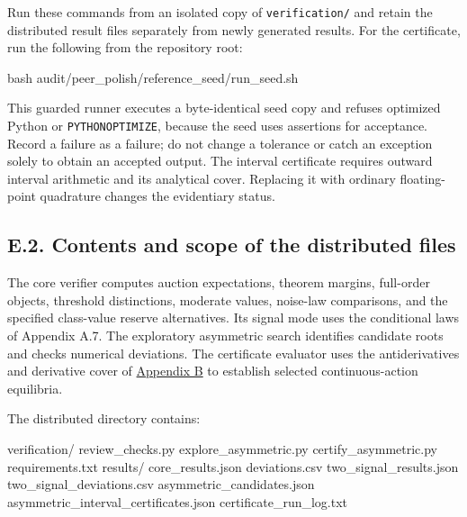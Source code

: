 \documentclass[
  11pt,
]{article}
\newenvironment{Shaded}{}{}
\newcommand{\FunctionTok}[1]{\textcolor[rgb]{0.02,0.16,0.49}{#1}}
\newcommand{\NormalTok}[1]{#1}
\begin{document}
Run these commands from an isolated copy of \texttt{verification/} and
retain the distributed result files separately from newly generated
results. For the certificate, run the following from the repository
root:

\begin{Shaded}
\begin{Highlighting}[]
\FunctionTok{bash}\NormalTok{ audit/peer\_polish/reference\_seed/run\_seed.sh}
\end{Highlighting}
\end{Shaded}

This guarded runner executes a byte-identical seed copy and refuses
optimized Python or \texttt{PYTHONOPTIMIZE}, because the seed uses
assertions for acceptance. Record a failure as a failure; do not change
a tolerance or catch an exception solely to obtain an accepted output.
The interval certificate requires outward interval arithmetic and its
analytical cover. Replacing it with ordinary floating-point quadrature
changes the evidentiary status.

\subsection{E.2. Contents and scope of the distributed
files}\label{oa-e-files}

The core verifier computes auction expectations, theorem margins,
full-order objects, threshold distinctions, moderate values, noise-law
comparisons, and the specified class-value reserve alternatives. Its
signal mode uses the conditional laws of Appendix A.7. The exploratory
asymmetric search identifies candidate roots and checks numerical
deviations. The certificate evaluator uses the antiderivatives and
derivative cover of \hyperref[oa-b]{Appendix B} to establish selected
continuous-action equilibria.

The distributed directory contains:

\begin{Shaded}
\begin{Highlighting}[]
\NormalTok{verification/}
\NormalTok{  review\_checks.py}
\NormalTok{  explore\_asymmetric.py}
\NormalTok{  certify\_asymmetric.py}
\NormalTok{  requirements.txt}
\NormalTok{  results/}
\NormalTok{    core\_results.json}
\NormalTok{    deviations.csv}
\NormalTok{    two\_signal\_results.json}
\NormalTok{    two\_signal\_deviations.csv}
\NormalTok{    asymmetric\_candidates.json}
\NormalTok{    asymmetric\_interval\_certificates.json}
\NormalTok{    certificate\_run\_log.txt}
\end{Highlighting}
\end{Shaded}
\end{document}
